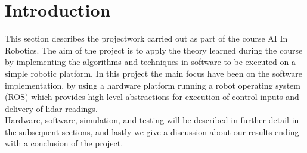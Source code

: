 
\section{Introduction} %
\label{sec:prokect_introduction}

This section describes the projectwork carried out as part of the course AI In Robotics. The aim of the project is to apply the theory learned during the course by implementing the algorithms and techniques in software to be executed on a simple robotic platform.
In this project the main focus have been on the software implementation, by using a hardware platform running a robot operating system (ROS) which provides high-level abstractions for execution of control-inputs and delivery of lidar readings.\\

Hardware, software, simulation, and testing will be described in further detail in the subsequent sections, and lastly we give a discussion about our results ending with a conclusion of the project.

